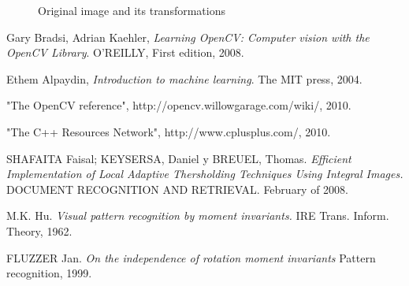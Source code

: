 \documentclass[10pt,journal]{IEEEtran}
\begin{document}
	\begin{figure}
	\centering
	\caption{Original image and its transformations}
	\end{figure}
	
	
	
	\begin{thebibliography}{9}
	
			Gary Bradsi, Adrian Kaehler,
			\emph{Learning OpenCV: Computer vision with the OpenCV Library}.
			O'REILLY,
			First edition,
			2008.
			
			Ethem Alpaydin,
			\emph{Introduction to machine learning}.
			The MIT press,
			2004.
		
			"The OpenCV reference",
			http://opencv.willowgarage.com/wiki/,
			2010.
			
			"The C++ Resources Network",
			http://www.cplusplus.com/,
			2010.
			
			SHAFAITA Faisal; KEYSERSA, Daniel y BREUEL, Thomas. 
			\emph{Efficient Implementation of Local Adaptive Thersholding Techniques Using Integral Images.}
			DOCUMENT RECOGNITION AND RETRIEVAL. 
			February of 2008.
			
			M.K. Hu.
			\emph{Visual pattern recognition by moment invariants.}
			IRE Trans. Inform. Theory,
			1962.
			
			FLUZZER Jan.
			\emph{On the independence of rotation moment invariants}
			Pattern recognition,
			1999.
			
	\end{thebibliography}
	
\end{document}

